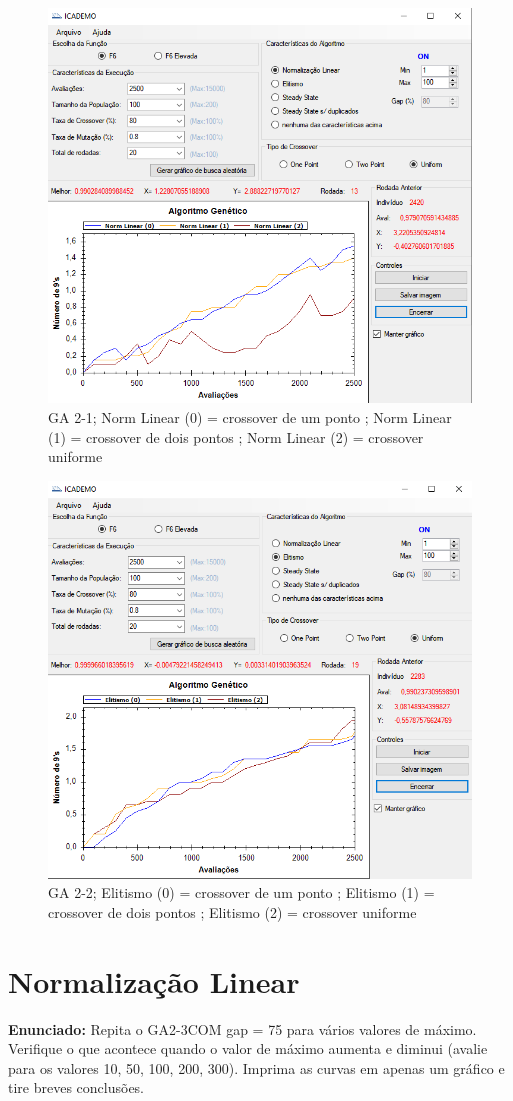\documentclass[12pt]{article}
\begin{document}
\begin{figure}[H]
	\centering
	\includegraphics[width=0.7\linewidth]{Imagens/questao6_1}
	\caption{GA 2-1; Norm Linear (0) = crossover de um ponto ; Norm Linear (1) = crossover de dois pontos ; Norm Linear (2) = crossover uniforme}
	\label{fig:questao61}
\end{figure}
\begin{figure}[H]
	\centering
	\includegraphics[width=0.7\linewidth]{Imagens/questao6_2}
	\caption{GA 2-2; Elitismo (0) = crossover de um ponto ; Elitismo (1) = crossover de dois pontos ; Elitismo (2) = crossover uniforme}
	\label{fig:questao62}
\end{figure}


\section{Normalização Linear}
\textbf{Enunciado:}
Repita o GA2-3COM gap = 75 para vários valores de máximo. Verifique o que acontece quando o valor de máximo aumenta e diminui (avalie para os valores 10, 50, 100, 200, 300). Imprima as curvas em apenas um gráfico e tire breves conclusões.\\
\end{document}
